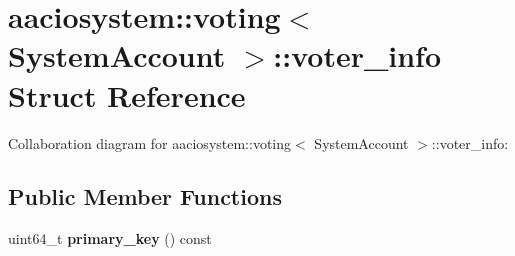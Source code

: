 \hypertarget{structaaciosystem_1_1voting_1_1voter__info}{}\section{aaciosystem\+:\+:voting$<$ System\+Account $>$\+:\+:voter\+\_\+info Struct Reference}
\label{structaaciosystem_1_1voting_1_1voter__info}


Collaboration diagram for aaciosystem\+:\+:voting$<$ System\+Account $>$\+:\+:voter\+\_\+info\+:
\subsection*{Public Member Functions}
\begin{DoxyCompactItemize}
\item 
\mbox{\label{structaaciosystem_1_1voting_1_1voter__info_a693b4f8d29590487ffbdfb8c7cf4bdd3}} 
uint64\+\_\+t {\bfseries primary\+\_\+key} () const
\end{DoxyCompactItemize}
